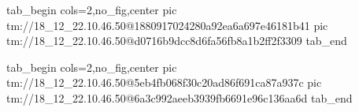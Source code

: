  
 
 
 
 

\qqSecCmtScr


\ifcmt
  tab_begin cols=2,no_fig,center
    pic tm://18_12_22.10.46.50@1880917024280a92ea6a697e46181b41
    pic tm://18_12_22.10.46.50@d0716b9dcc8d6fa56fb8a1b2ff2f3309
  tab_end
\fi


\ifcmt
  tab_begin cols=2,no_fig,center
    pic tm://18_12_22.10.46.50@5eb4fb068f30c20ad86f691ca87a937c
    pic tm://18_12_22.10.46.50@6a3c992aeeb3939fb6691e96c136aa6d
  tab_end
\fi

